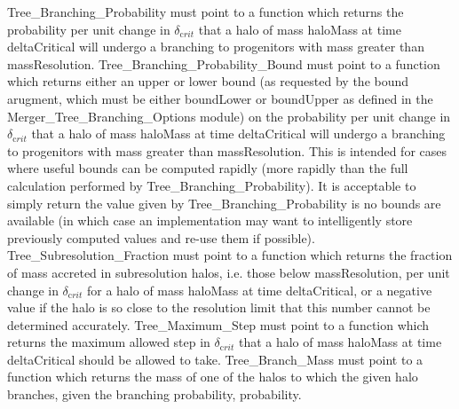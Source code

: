 {\normalfont \ttfamily Tree\_Branching\_Probability} must point to a function which returns the probability per unit change in $\delta_{\mathrm crit}$ that a halo of mass {\normalfont \ttfamily haloMass} at time {\normalfont \ttfamily deltaCritical} will undergo a branching to progenitors with mass greater than {\normalfont \ttfamily massResolution}. {\normalfont \ttfamily Tree\_Branching\_Probability\_Bound} must point to a function which returns either an upper or lower bound (as requested by the {\normalfont \ttfamily bound} arugment, which must be either {\normalfont \ttfamily boundLower} or {\normalfont \ttfamily boundUpper} as defined in the {\normalfont \ttfamily Merger\_Tree\_Branching\_Options} module) on the probability per unit change in $\delta_{\mathrm crit}$ that a halo of mass {\normalfont \ttfamily haloMass} at time {\normalfont \ttfamily deltaCritical} will undergo a branching to progenitors with mass greater than {\normalfont \ttfamily massResolution}. This is intended for cases where useful bounds can be computed rapidly (more rapidly than the full calculation performed by {\normalfont \ttfamily Tree\_Branching\_Probability}). It is acceptable to simply return the value given by {\normalfont \ttfamily Tree\_Branching\_Probability} is no bounds are available (in which case an implementation may want to intelligently store previously computed values and re-use them if possible). {\normalfont \ttfamily Tree\_Subresolution\_Fraction} must point to a function which returns the fraction of mass accreted in subresolution halos, i.e. those below {\normalfont \ttfamily massResolution}, per unit change in $\delta_{\mathrm crit}$ for a halo of mass {\normalfont \ttfamily haloMass} at time {\normalfont \ttfamily deltaCritical}, or a negative value if the halo is so close to the resolution limit that this number cannot be determined accurately. {\normalfont \ttfamily Tree\_Maximum\_Step} must point to a function which returns the maximum allowed step in $\delta_{\mathrm crit}$ that a halo of mass {\normalfont \ttfamily haloMass} at time {\normalfont \ttfamily deltaCritical} should be allowed to take. {\normalfont \ttfamily Tree\_Branch\_Mass} must point to a function which returns the mass of one of the halos to which the given halo branches, given the branching 
probability, {\normalfont \ttfamily probability}.

